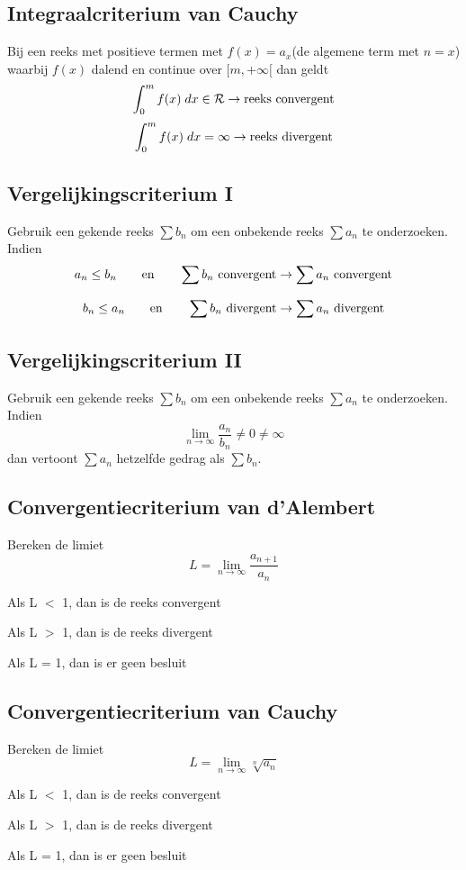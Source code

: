\documentclass{report}
\begin{document}
\subsection*{Integraalcriterium van Cauchy}
Bij een reeks met positieve termen met $f(x) = a_x$(de algemene term met $n = x$) waarbij $f(x)$ dalend en continue over $[m , +\infty[$ dan geldt
$$\int_0^m f(x)\;dx \in \mathcal{R} \rightarrow \hbox{reeks convergent}$$
$$\int_0^m f(x)\;dx = \infty \rightarrow \hbox{reeks divergent} $$

\subsection*{Vergelijkingscriterium I}
Gebruik een gekende reeks $\sum b_n$ om een onbekende reeks $\sum a_n$ te onderzoeken. Indien
$$a_n \leq b_n \qquad \hbox{en} \qquad \sum b_n \hbox{  convergent} \rightarrow \sum a_n \hbox {  convergent}$$

$$b_n \leq a_n \qquad \hbox{en} \qquad \sum b_n \hbox{  divergent} \rightarrow \sum a_n \hbox {  divergent}$$
\subsection*{Vergelijkingscriterium II}
Gebruik een gekende reeks $\sum b_n$ om een onbekende reeks $\sum a_n$ te onderzoeken. Indien 
$$\lim\limits_{n\to\infty} \frac{a_n}{b_n} \neq 0 \neq \infty$$
dan vertoont $\sum a_n$ hetzelfde gedrag als $\sum b_n$.

\subsection*{Convergentiecriterium van d'Alembert}
Bereken de limiet
$$L = \lim\limits_{n\to\infty} \frac{a_{n+1}}{a_n}$$

Als L $<$ 1, dan is de reeks convergent

Als L $>$ 1, dan is de reeks divergent

Als L = 1, dan is er geen besluit
\subsection*{Convergentiecriterium van Cauchy}
Bereken de limiet
$$L = \lim\limits_{n\to\infty} \sqrt[n]{a_n}$$

Als L $<$ 1, dan is de reeks convergent

Als L $>$ 1, dan is de reeks divergent

Als L = 1, dan is er geen besluit
\end{document}
